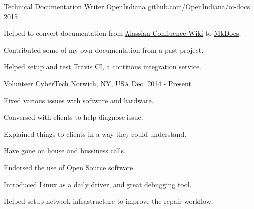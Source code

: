 


\begin{cventries}


\cventry
{Technical Documentation Writer} %
{OpenIndiana} %
{\href{https://github.com/OpenIndiana/oi-docs}{github.com/OpenIndiana/oi-docs}} %
{2015} %
{ %
\begin{cvitems}
\item {Helped to convert documentation from \href{https://www.atlassian.com/software/confluence}{Alassian Confluence Wiki} to \href{http://www.mkdocs.org/}{MkDocs}.}
\item {Contributed some of my own documentation from a past project.}
\item {Helped setup and test \href{https://travis-ci.org/}{Travis CI}, a continous integration service.}
\end{cvitems}
}


\cventry
{Volunteer} %
{CyberTech} %
{Norwich, NY, USA} %
{Dec. 2014 - Present} %
{ %
\begin{cvitems}
\item {Fixed various issues with software and hardware.}
\item {Conversed with clients to help diagnose issue.}
\item {Explained things to clients in a way they could understand.}
\item {Have gone on house and bussiness calls.}
\item {Endorsed the use of Open Source software.}
\item {Introduced Linux as a daily driver, and great debugging tool.}
\item {Helped setup network infrastructure to improve the repair workflow.}
\end{cvitems}
}


\end{cventries}
